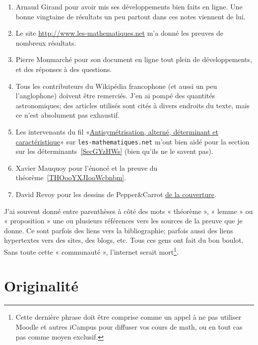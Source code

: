 \begin{enumerate}
	\item
	      Arnaud Girand pour avoir mis ses développements bien faits en ligne. Une bonne vingtaine de résultats un peu partout dans ces notes viennent de lui.
	\item
	      Le site \url{http://www.les-mathematiques.net} m'a donné les preuves de nombreux résultats.
	\item
	      Pierre Monmarché pour son document en ligne tout plein de développements, et des réponses à des questions.
	\item
	      Tous les contributeurs du Wikipédia francophone (et aussi un peu l'anglophone) doivent être remerciés. J'en ai pompé des quantités astronomiques; des articles utilisés sont cités à divers endroits du texte, mais ce n'est absolument pas exhaustif.
	\item
	      Les intervenants du fil «\href{http://www.les-mathematiques.net/phorum/read.php?2,302266}{Antisymétrisation, alterné, déterminant et caractéristique}» sur \texttt{les-mathematiques.net} m'ont bien aidé pour la section sur les déterminants~\ref{SecGYzHWs} (bien qu'ils ne le savent pas).
	\item
	      Xavier Mauquoy pour l'énoncé et la preuve du théorème~\ref{THOooYXJIooWcbnbm}.
	\item
	      David Revoy pour les dessins de Pepper\&Carrot \href{https://www.peppercarrot.com/fr/article285/episode-8-pepper-s-birthday-party}{de la couverture}.
\end{enumerate}

J'ai souvent donné entre parenthèses à côté des mots « théorème », « lemme » ou « proposition » une ou plusieurs références vers les sources de la preuve que je donne. Ce sont parfois des liens vers la bibliographie; parfois aussi des liens hypertextes vers des sites, des blogs, etc. Tous ces gens ont fait du bon boulot. Sans toute cette « communauté », l'internet serait mort\footnote{Cette dernière phrase doit être comprise comme un appel à ne pas utiliser Moodle et autres iCampus pour diffuser vos cours de math, ou en tout cas pas comme moyen exclusif.}.

\section{Originalité}


